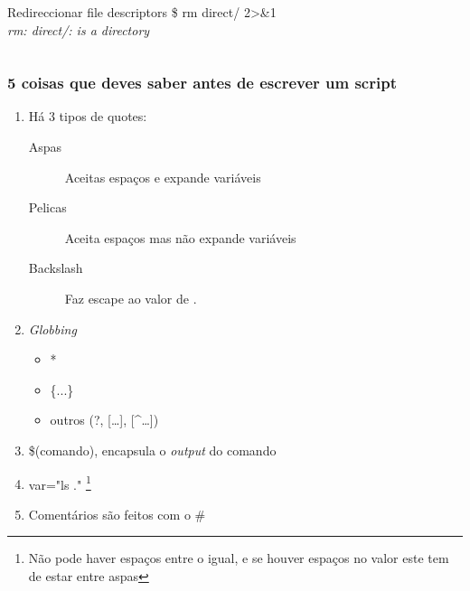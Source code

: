 \documentclass[t,notes=show]{beamer}
\begin{document}
\begin{frame}[fragile]
\begin{columns}
\begin{column}[t]{.5\textwidth}
{\begin{semiverbatim}
\begin{block}{Redireccionar file descriptors}
							\$ rm direct/ 2>\&1   \\
							\emph{rm: direct/: is a directory} \\
						\end{block}	
					\end{semiverbatim}
				}
			\end{column}
		\end{columns}			
	\end{frame}
	
	\begin{frame}
		\frametitle{5 coisas que deves saber antes de escrever um script}
		\begin{enumerate}
			\item Há 3 tipos de quotes:
			\begin{description}
				\item[Aspas] Aceitas espaços e expande variáveis 
				\item[Pelicas] Aceita espaços mas não expande variáveis
				\item[Backslash] Faz escape ao valor de .
			\end{description}
			\item \emph{Globbing}
			\begin{itemize}
				\item *
				\item \{...\}
				\item outros (?, [\ldots], [\^{}\ldots])
			\end{itemize}
			\item \$(comando), encapsula o \emph{output} do comando
			\item var="ls ." \footnote{Não pode haver espaços entre o igual, e se houver espaços no valor este tem de estar entre aspas}
			\item Comentários são feitos com o \#
		\end{enumerate}
	\end{frame}
	
\end{document}
